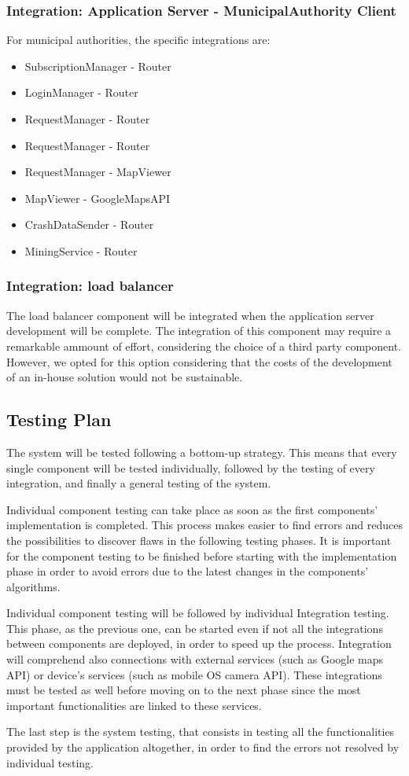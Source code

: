 \subsubsection{Integration: Application Server - MunicipalAuthority Client}
For municipal authorities, the specific integrations are:
\begin{itemize}
	\item SubscriptionManager - Router
	\item LoginManager - Router
	\item RequestManager - Router
	\item RequestManager - Router
	\item RequestManager - MapViewer 
	\item MapViewer - GoogleMapsAPI
	\item CrashDataSender - Router	
	\item MiningService - Router
\end{itemize}

\subsubsection{Integration: load balancer}
The load balancer component will be integrated when the application server development will be complete. The integration of this component may require a remarkable ammount of effort, considering the choice of a third party component. However, we opted for this option considering that the costs of the development of an in-house solution would not be sustainable.

\subsection{Testing Plan}
The system will be tested following a bottom-up strategy.
This means that every single component will be tested individually, followed by the testing of every integration, and finally a general testing of the system.	\par
Individual component testing can take place as soon as the first components' implementation is completed.
This process makes easier to find errors and reduces the possibilities to discover flaws in the following testing phases.
It is important for the component testing to be finished before starting with the implementation phase in order to avoid errors due to the latest changes in the components' algorithms. \par
Individual component testing will be followed by individual Integration testing.
This phase, as the previous one, can be started even if not all the integrations between components are deployed, in order to speed up the process.
Integration will comprehend also connections with external services (such as Google maps API) or device's services (such as mobile OS camera API). These integrations must be tested as well before moving on to the next phase since the most important functionalities are linked to these services. \par
The last step is the system testing, that consists in testing all the functionalities provided by the application altogether, in order to find the errors not resolved by individual testing.
